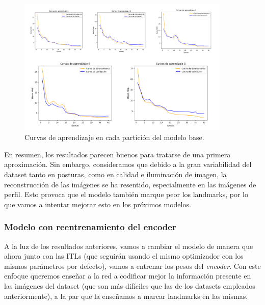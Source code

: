             \begin{figure}[!h]
                \centering
                \includegraphics[width=0.9\textwidth]{img/curvas_aprendizaje_modelbase.png}
                \caption{Curvas de aprendizaje en cada partición del modelo base.}
                \label{fig:Curvas_modelbase}
            \end{figure}

            \noindent En resumen, los resultados parecen buenos para tratarse de una primera aproximación. Sin embargo, consideramos que debido a la gran variabilidad del dataset tanto en posturas, como en calidad e iluminación de imagen, la reconstrucción de las imágenes se ha resentido, especialmente en las imágenes de perfil. Esto provoca que el modelo también marque peor los landmarks, por lo que vamos a intentar mejorar esto en los próximos modelos.

        \subsubsection{Modelo con reentrenamiento del encoder}
            \noindent A la luz de los resultados anteriores, vamos a cambiar el modelo de manera que ahora junto con las ITLs (que seguirán usando el mismo optimizador con los mismos parámetros por defecto), vamos a entrenar los pesos del \textit{encoder}. Con este enfoque queremos enseñar a la red a codificar mejor la información presente en las imágenes del dataset (que son más difíciles que las de los datasets empleados anteriormente), a la par que la enseñamos a marcar landmarks en las mismas. 

            \medskip

